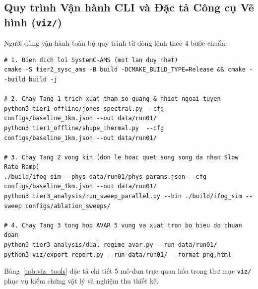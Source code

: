 \documentclass[11pt, a4paper]{article}
\begin{document}
\subsection{Quy trình Vận hành CLI và Đặc tả Công cụ Vẽ hình (\texttt{viz/})}
Người dùng vận hành toàn bộ quy trình từ dòng lệnh theo 4 bước chuẩn:
\begin{footnotesize}
\begin{verbatim}
# 1. Bien dich loi SystemC-AMS (mot lan duy nhat)
cmake -S tier2_sysc_ams -B build -DCMAKE_BUILD_TYPE=Release && cmake --build build -j

# 2. Chay Tang 1 trich xuat tham so quang & nhiet ngoai tuyen
python3 tier1_offline/jones_spectral.py --cfg configs/baseline_1km.json --out data/run01/
python3 tier1_offline/shupe_thermal.py  --cfg configs/baseline_1km.json --out data/run01/

# 3. Chay Tang 2 vong kin (don le hoac quet song song da nhan Slow Rate Ramp)
./build/ifog_sim --phys data/run01/phys_params.json --cfg configs/baseline_1km.json --out data/run01/
python3 tier3_analysis/run_sweep_parallel.py --bin ./build/ifog_sim --sweep configs/ablation_sweeps/

# 4. Chay Tang 3 tong hop AVAR 5 vung va xuat tron bo bieu do chuan doan
python3 tier3_analysis/dual_regime_avar.py --run data/run01/
python3 viz/export_report.py --run data/run01/ --format png,html
\end{verbatim}
\end{footnotesize}

Bảng~\ref{tab:viz_tools} đặc tả chi tiết 5 mô-đun trực quan hóa trong thư mục \texttt{viz/} phục vụ kiểm chứng vật lý và nghiệm thu thiết kế.
\end{document}
